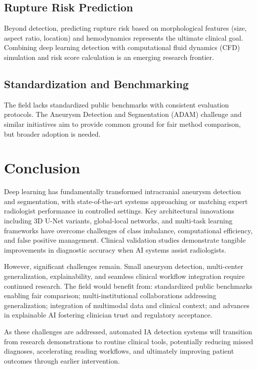 \documentclass[conference]{IEEEtran}
\begin{document}
\subsection{Rupture Risk Prediction}
Beyond detection, predicting rupture risk based on morphological features (size, aspect ratio, location) and hemodynamics represents the ultimate clinical goal. Combining deep learning detection with computational fluid dynamics (CFD) simulation and risk score calculation is an emerging research frontier.

\subsection{Standardization and Benchmarking}
The field lacks standardized public benchmarks with consistent evaluation protocols. The Aneurysm Detection and Segmentation (ADAM) challenge and similar initiatives aim to provide common ground for fair method comparison, but broader adoption is needed.

\section{Conclusion}

Deep learning has fundamentally transformed intracranial aneurysm detection and segmentation, with state-of-the-art systems approaching or matching expert radiologist performance in controlled settings. Key architectural innovations including 3D U-Net variants, global-local networks, and multi-task learning frameworks have overcome challenges of class imbalance, computational efficiency, and false positive management. Clinical validation studies demonstrate tangible improvements in diagnostic accuracy when AI systems assist radiologists.

However, significant challenges remain. Small aneurysm detection, multi-center generalization, explainability, and seamless clinical workflow integration require continued research. The field would benefit from: standardized public benchmarks enabling fair comparison; multi-institutional collaborations addressing generalization; integration of multimodal data and clinical context; and advances in explainable AI fostering clinician trust and regulatory acceptance.

As these challenges are addressed, automated IA detection systems will transition from research demonstrations to routine clinical tools, potentially reducing missed diagnoses, accelerating reading workflows, and ultimately improving patient outcomes through earlier intervention.
\end{document}
